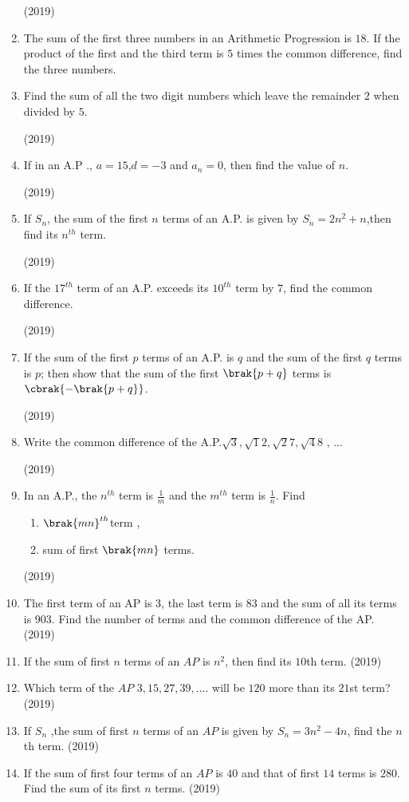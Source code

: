 \begin{enumerate}[label=\thesubsection.\arabic*,ref=\thesubsection.\theenumi,itemsep=1pt]
\hfill (2019) \item The sum of the first three numbers in an Arithmetic Progression is $18$. If the product of the first and the third term is $5$ times the common
difference, find the three numbers.
 \item Find the sum of all the two digit numbers which leave the remainder $2$ when divided by $5$.

\hfill (2019) \item If in an A.P ., $a=15$,$d=-3$ and $a_n=0$, then find the value of $n$.

\hfill (2019) \item If ${S_n}$, the sum of the first ${n}$ terms of an A.P. is given by ${S_n = 2n^2 + n}$,then find its $n^{th}$ term. 

\hfill (2019) \item If the $17^{th}$ term of an A.P. exceeds its $10^{th}$ term by $7$, find the common difference.

\hfill (2019) \item If the sum of the first $p$ terms of an A.P. is $q$ and the sum of the first $q$ terms is $p$; then show that the sum of the first $\brak{p + q}$ terms is $\cbrak {-\brak {p + q}}$.

\hfill (2019) \item Write the common difference of the A.P.${\sqrt3} , {\sqrt12} , {\sqrt27} , {\sqrt48}$ , ... 

\hfill (2019) \item In an A.P., the $n^{th}$ term is ${\frac{1}{m}}$ and the $m^{th}$ term is $\frac{1}{n}$. Find 
\begin{enumerate}
      \item  $\brak{mn}^{th}$term  ,
      \item sum of first $\brak{mn}$ terms.
\end{enumerate}
\hfill (2019)

 \item The first term of an AP is 3, the last term is 83 and the sum of all its terms is 903. Find the number of terms and the common difference of the AP.
\hfill (2019) \item If the sum of first $n$ terms of an $AP$ is $n^2$, then find its $10$th term.
\hfill (2019) \item Which term of the $AP$ $3, 15, 27, 39, ....$ will be $120$ more than its $21$st term?
\hfill (2019) \item If $S_n$ ,the sum of first $n$ terms of an $AP$ is given by $S_n=3n^2-4n$, find the $n$th term.
\hfill (2019) \item If the sum of first four terms of an $AP$ is $40$ and that of first $14$ terms is $280$. Find the sum of its first $n$ terms.
\hfill (2019)


\end{enumerate}
